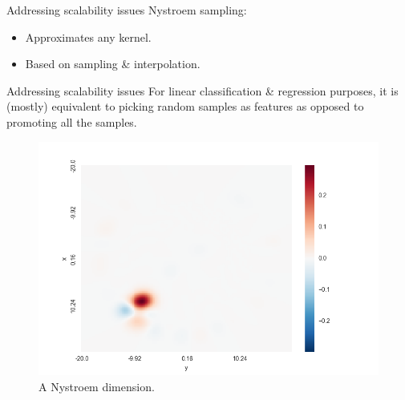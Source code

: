 \documentclass[11pt]{beamer}
\begin{document}
\begin{frame}{Addressing scalability issues}
Nystroem sampling:
\begin{itemize}
\item Approximates any kernel. 
\item Based on sampling \& interpolation.
\end{itemize}
 
\end{frame}

\begin{frame}{Addressing scalability issues}
For linear classification \& regression purposes, it is (mostly) equivalent to picking random samples as features as opposed to promoting all the samples.
\begin{figure}[h]
\begin{center}
\includegraphics[scale=0.3]{nystroem_dimension.png}
\end{center}
\caption{A Nystroem dimension.}
\end{figure} 

\end{frame}
\end{document}
